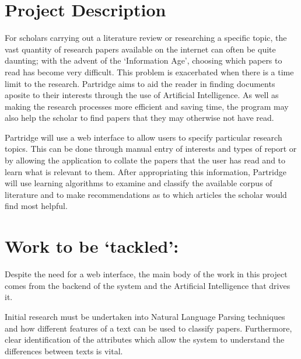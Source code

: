 \documentclass[12pt,a4paper]{article}
\begin{document}



\setlength{\parindent}{0pt}
\setlength{\parskip}{1.5ex plus 0.5ex minus 0.2ex}


\pagebreak

\section{Project Description}

For scholars carrying out a literature review or researching a specific topic,
the vast quantity of research papers available on the internet can often be quite daunting;  
with the advent of the `Information Age', choosing which papers to read 
has become very difficult. This problem is exacerbated when there is a 
time limit to the research. Partridge aims to aid the 
reader in finding documents aposite to their interests through the use of 
Artificial Intelligence. As well as making the research processes 
more efficient and saving time, the program may also help the scholar to find
papers that they may otherwise not have read.

Partridge will use a web interface to allow users to specify particular
research topics. This can be done through manual entry of interests and types of 
report or by allowing the application to collate the papers that the user 
has read and to learn what is relevant to them. After appropriating this information,
Partridge will use learning algorithms to examine and classify the available
corpus of literature and to make recommendations as to which articles the
scholar would find most helpful. 

\section{Work to be `tackled':}
Despite the need for a web interface, the main body of the work in this project 
comes from the backend of the system and the Artificial Intelligence that drives it.

Initial research must be undertaken  into Natural Language
Parsing techniques and how different features of a text can be used to
classify papers. Furthermore, clear identification of the attributes which
allow the system to understand the differences between texts is vital.
\end{document}
